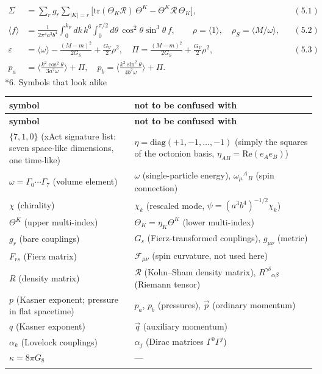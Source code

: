 \documentclass[10pt,a4paper]{article}
\makeatletter
\renewcommand\section{\@startsection{section}{1}{\z@}{-3.5ex \@plus -1ex \@minus -.2ex}{2.3ex \@plus.2ex}{\normalfont\Large\bfseries\raggedright}}
\makeatother
\begin{document}
\begin{align*}
\Sigma&=\sum_rg_r\sum_{|K|=r}\big[\mathrm{tr}(\Theta_K\mathcal R)\,\Theta^K-\Theta^K\mathcal R\,\Theta_K\big],&&(5.1) \\
\langle f\rangle&=\frac{1}{2\pi^4a^3b^4}\int_0^{k_F}dk\,k^6\int_0^{\pi/2}d\theta\,\cos^2\theta\sin^3\theta\,f,\qquad \rho=\langle1\rangle,\quad \rho_S=\langle M/\omega\rangle,&&(5.2) \\
\varepsilon&=\langle\omega\rangle-\frac{(M-m)^2}{2G_S}+\frac{G_V}2\rho^2,\quad \Pi=\frac{(M-m)^2}{2G_S}+\frac{G_V}2\rho^2,&&(5.3) \\
p_a&=\Big\langle\frac{k^2\cos^2\theta}{3a^2\omega}\Big\rangle+\Pi,\quad p_b=\Big\langle\frac{k^2\sin^2\theta}{4b^2\omega}\Big\rangle+\Pi .
\end{align*}
\section*{6. Symbols that look alike}
{\small
\begin{longtable}{>{\raggedright\arraybackslash}p{}>{\raggedright\arraybackslash}p{}}
\toprule
\textbf{symbol} & \textbf{not to be confused with} \\
\midrule\endfirsthead
\toprule
\textbf{symbol} & \textbf{not to be confused with} \\
\midrule\endhead
\endfoot
\bottomrule\endlastfoot
$\{7,1,0\}$ (xAct signature list: seven space-like dimensions, one time-like) & $\eta=\mathrm{diag}(+1,-1,\dots,-1)$ (simply the squares of the octonion basis, $\eta_{AB}=\mathrm{Re}(e_Ae_B)$) \\
$\omega=\Gamma_0\cdots\Gamma_7$ (volume element) & $\omega$ (single-particle energy), $\omega_\mu{}^A{}_B$ (spin connection) \\
$\chi$ (chirality) & $\chi_k$ (rescaled mode, $\psi=(a^3b^4)^{-1/2}\chi_k$) \\
$\Theta^K$ (upper multi-index) & $\Theta_K=\eta_K\Theta^K$ (lower multi-index) \\
$g_r$ (bare couplings) & $G_s$ (Fierz-transformed couplings), $g_{\mu\nu}$ (metric) \\
$F_{rs}$ (Fierz matrix) & $\mathcal F_{\mu\nu}$ (spin curvature, not used here) \\
$R$ (density matrix) & $\mathcal R$ (Kohn–Sham density matrix), $R^{\gamma\delta}{}_{\alpha\beta}$ (Riemann tensor) \\
$p$ (Kasner exponent; pressure in flat spacetime) & $p_a$, $p_b$ (pressures), $\vec p$ (ordinary momentum) \\
$q$ (Kasner exponent) & $\vec q$ (auxiliary momentum) \\
$\alpha_k$ (Lovelock couplings) & $\alpha_j$ (Dirac matrices $\Gamma^0\Gamma^j$) \\
$\kappa=8\pi G_8$ & — \\*
\end{longtable}}
\end{document}
